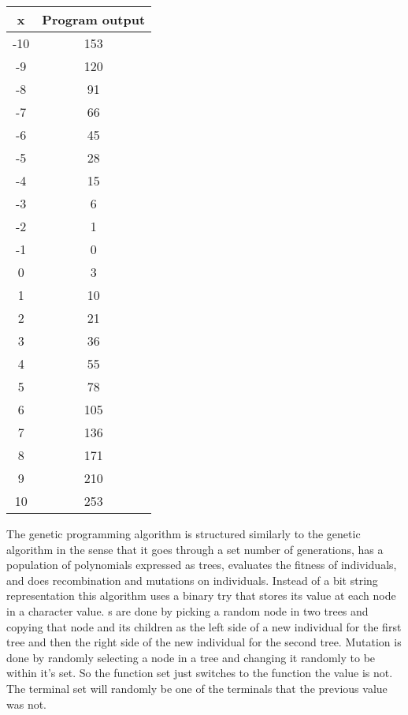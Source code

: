 \begin{table}[h]
\centering
\begin{tabular}{cc}
\hline
x   & Program output \\ \hline
-10 & 153            \\ \hline
-9  & 120            \\ \hline
-8  & 91             \\ \hline
-7  & 66             \\ \hline
-6  & 45             \\ \hline
-5  & 28             \\ \hline
-4  & 15             \\ \hline
-3  & 6              \\ \hline
-2  & 1              \\ \hline
-1  & 0              \\ \hline
0   & 3              \\ \hline
1   & 10             \\ \hline
2   & 21             \\ \hline
3   & 36             \\ \hline
4   & 55             \\ \hline
5   & 78             \\ \hline
6   & 105            \\ \hline
7   & 136            \\ \hline
8   & 171            \\ \hline
9   & 210            \\ \hline
10  & 253            \\ \hline
\end{tabular}
\end{table}
\par
The genetic programming algorithm is structured similarly to the genetic algorithm in the sense that it goes through a set number of generations, has a population of polynomials expressed as trees, evaluates the fitness of individuals, and does recombination and mutations on individuals. Instead of a bit string representation this algorithm uses a binary try that stores its value at each node in a character value. s are done by picking a random node in two trees and copying that node and its children as the left side of a new individual for the first tree and then the right side of the new individual for the second tree. Mutation is done by randomly selecting a node in a tree and changing it randomly to be within it's set. So the function set just switches to the function the value is not. The terminal set will randomly be one of the terminals that the previous value was not.
